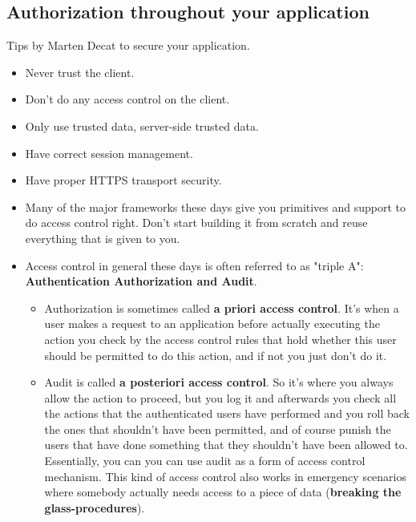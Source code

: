 \documentclass[../main.tex]{subfiles}
\begin{document}
\subsection{Authorization throughout your application}
Tips by Marten Decat to secure your application.
\begin{itemize}
\item Never trust the client.
\item Don't do any access control on the client.
\item Only use trusted data, server-side trusted data.
\item Have correct session management.
\item Have proper HTTPS transport security.
\item Many of the major frameworks these days give you primitives and support to do access control right. Don't start building it from scratch and reuse everything that is given to you.
\item Access control in general these days is often referred to as "triple A": \textbf{Authentication Authorization and Audit}.
\begin{itemize}
\item Authorization is sometimes called \textbf{a priori access control}. It's when a user makes a request to an application before actually executing the action you check by the access control rules that hold whether this user should be permitted to do this action, and if not you just don't do it.
\item Audit is called \textbf{a posteriori access control}. So it's where you always allow the action to proceed, but you log it and afterwards you check all the actions that the authenticated users have performed and you roll back the ones that shouldn't have been permitted, and of course punish the users that have done something that they shouldn't have been allowed to. Essentially, you can you can use audit as a form of access control mechanism. This kind of access control also works in emergency scenarios where somebody actually needs access to a piece of data (\textbf{breaking the glass-procedures}).
\end{itemize} 
\end{itemize}
\end{document}
